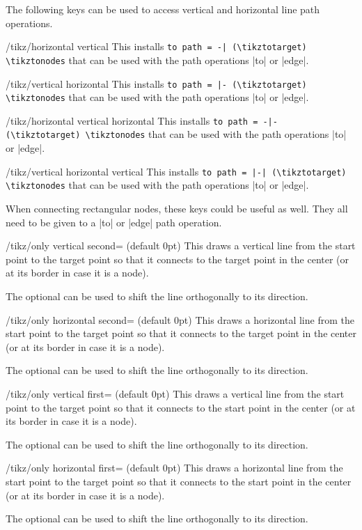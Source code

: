 The following keys can be used to access vertical and horizontal line path operations.
\begin{stylekey}{/tikz/horizontal vertical}
  This installs  \verb!to path = -| (\tikztotarget) \tikztonodes!
  that can be used with the path operations |to| or |edge|.
\end{stylekey}
\begin{stylekey}{/tikz/vertical horizontal}
  This installs \verb!to path = |- (\tikztotarget) \tikztonodes!
  that can be used with the path operations |to| or |edge|.
\end{stylekey}
\begin{stylekey}{/tikz/horizontal vertical horizontal}
  This installs  \verb!to path = -|- (\tikztotarget) \tikztonodes!
  that can be used with the path operations |to| or |edge|.
\end{stylekey}
\begin{stylekey}{/tikz/vertical horizontal vertical}
  This installs  \verb!to path = |-| (\tikztotarget) \tikztonodes!
  that can be used with the path operations |to| or |edge|.
\end{stylekey}

When connecting rectangular nodes, these keys could be useful as well.
They all need to be given to a |to| or |edge| path operation.
\begin{stylekey}{/tikz/only vertical second= (default 0pt)}
This draws a vertical line from the start point to the target point so that
it connects to the target point in the center (or at its border in case it is a node).

The optional  can be used to shift the line orthogonally to its direction.
\end{stylekey}
\begin{stylekey}{/tikz/only horizontal second= (default 0pt)}
This draws a horizontal line from the start point to the target point so that
it connects to the target point in the center (or at its border in case it is a node).

The optional  can be used to shift the line orthogonally to its direction.
\end{stylekey}
\begin{stylekey}{/tikz/only vertical first= (default 0pt)}
This draws a vertical line from the start point to the target point so that
it connects to the start point in the center (or at its border in case it is a node).

The optional  can be used to shift the line orthogonally to its direction.
\end{stylekey}
\begin{stylekey}{/tikz/only horizontal first= (default 0pt)}
This draws a horizontal line from the start point to the target point so that
it connects to the start point in the center (or at its border in case it is a node).

The optional  can be used to shift the line orthogonally to its direction.
\end{stylekey}

